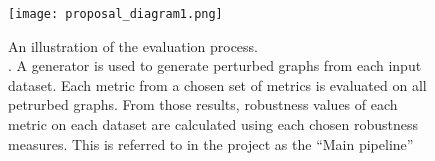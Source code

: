\begin{figure}[p!]
    \centering
    \texttt{[image: proposal\_diagram1.png]}
    \caption{An illustration of the evaluation process.\\ .
    A generator is used to generate perturbed graphs from each input dataset.
    Each metric from a chosen set of metrics is evaluated on all petrurbed graphs.
    From those results, robustness values of each metric on each dataset are calculated using each chosen robustness measures.
    This is referred to in the project as the ``Main pipeline''}
    \label{fig:overview_prop_diagram}
\end{figure}
